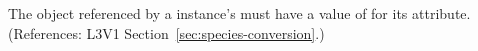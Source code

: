 The \Parameter object referenced by a \Species instance's
 must have a value of  for its
 attribute.  (References: L3V1
Section~\ref{sec:species-conversion}.)
